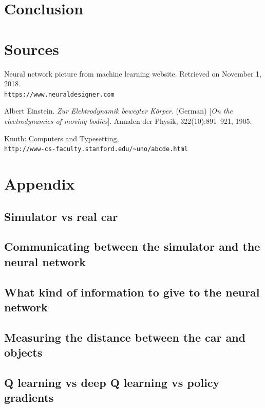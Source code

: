 \documentclass{article}
\begin{document}
\section{Conclusion}

\section{Sources}
\clearpage
\begin{thebibliography}{9}
Neural network picture from machine learning website. 
\newline
Retrieved on November 1, 2018.
\\\texttt{https://www.neuraldesigner.com}
 
Albert Einstein. 
\textit{Zur Elektrodynamik bewegter K{\"o}rper}. (German) 
[\textit{On the electrodynamics of moving bodies}]. 
Annalen der Physik, 322(10):891–921, 1905.
 
Knuth: Computers and Typesetting,
\\\texttt{http://www-cs-faculty.stanford.edu/\~{}uno/abcde.html}
\end{thebibliography}

\section{Appendix}
\subsection{Simulator vs real car}
\subsection{Communicating between the simulator and the neural network}
\subsection{What kind of information to give to the neural network}
\subsection{Measuring the distance between the car and objects}
\subsection{Q learning vs deep Q learning vs policy gradients}
\end{document}
